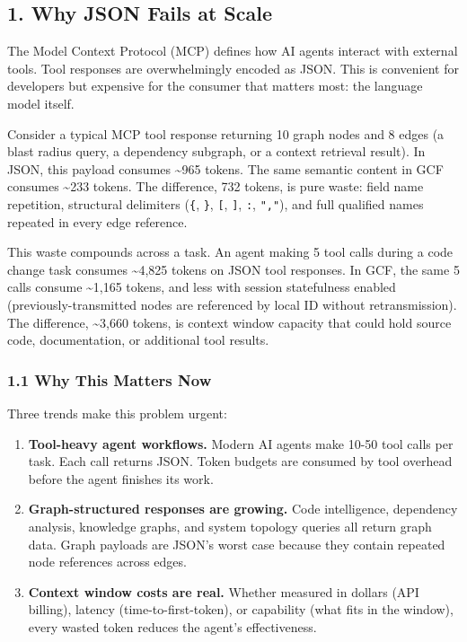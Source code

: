 \documentclass[
  11pt,
  paper=a4,
  ,captions=tableheading
]{scrartcl}
\begin{document}
\subsection{1. Why JSON Fails at Scale}\label{why-json-fails-at-scale}

The Model Context Protocol (MCP) defines how AI agents interact with
external tools. Tool responses are overwhelmingly encoded as JSON. This
is convenient for developers but expensive for the consumer that matters
most: the language model itself.

Consider a typical MCP tool response returning 10 graph nodes and 8
edges (a blast radius query, a dependency subgraph, or a context
retrieval result). In JSON, this payload consumes \textasciitilde965
tokens. The same semantic content in GCF consumes \textasciitilde233
tokens. The difference, 732 tokens, is pure waste: field name
repetition, structural delimiters (\texttt{\{}, \texttt{\}},
\texttt{{[}}, \texttt{{]}}, \texttt{:}, \texttt{","}), and full
qualified names repeated in every edge reference.

This waste compounds across a task. An agent making 5 tool calls during
a code change task consumes \textasciitilde4,825 tokens on JSON tool
responses. In GCF, the same 5 calls consume \textasciitilde1,165 tokens,
and less with session statefulness enabled (previously-transmitted nodes
are referenced by local ID without retransmission). The difference,
\textasciitilde3,660 tokens, is context window capacity that could hold
source code, documentation, or additional tool results.

\subsubsection{1.1 Why This Matters Now}\label{why-this-matters-now}

Three trends make this problem urgent:

\begin{enumerate}
\def\labelenumi{\arabic{enumi}.}
\item
  \textbf{Tool-heavy agent workflows.} Modern AI agents make 10-50 tool
  calls per task. Each call returns JSON. Token budgets are consumed by
  tool overhead before the agent finishes its work.
\item
  \textbf{Graph-structured responses are growing.} Code intelligence,
  dependency analysis, knowledge graphs, and system topology queries all
  return graph data. Graph payloads are JSON's worst case because they
  contain repeated node references across edges.
\item
  \textbf{Context window costs are real.} Whether measured in dollars
  (API billing), latency (time-to-first-token), or capability (what fits
  in the window), every wasted token reduces the agent's effectiveness.
\end{enumerate}
\end{document}
